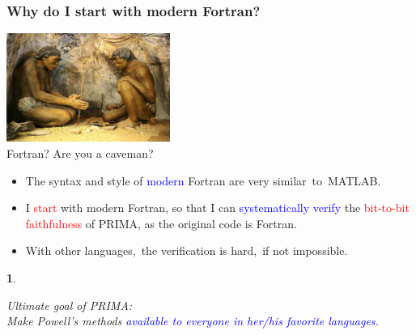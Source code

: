 \documentclass[slidestop,mathserif,xcolor=dvipsnames]{beamer}
\newcommand{\blue}[1]{\textcolor{blue}{#1}}
\newcommand{\red}[1]{\textcolor{red}{#1}}
\newtheorem*{mybox}{}
\begin{document}
\begin{frame}
    \frametitle{Why do I start with modern Fortran?}

    \begin{center}
    \includegraphics[width=0.4\textwidth]{caveman.jpg}
    \\[1ex]{Fortran? Are you a caveman?}
    \end{center}

    \begin{itemize}
        \item The syntax and style of \blue{modern} Fortran are very similar~to~MATLAB.
            \vspace{0.5ex}
        \item I \red{start} with modern Fortran, so that I can \blue{systematically verify} the
            \red{bit-to-bit faithfulness} of PRIMA,  as the original code is Fortran.%
            \vspace{0.5ex}
        \item With other languages,~the verification is hard,~if not impossible.%
    \end{itemize}

 \begin{mybox}
    \begin{center}
        \textnormal{
            Ultimate goal of PRIMA: \\
            Make Powell's methods \blue{available to everyone in her/his favorite languages}.
        }
    \end{center}
\end{mybox}


\end{frame}
\end{document}
